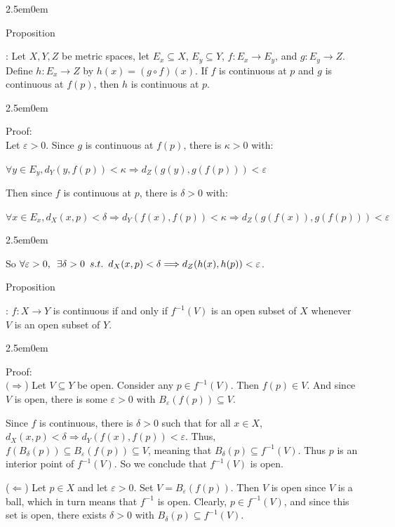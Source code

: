 \documentclass{book}
\newcommand{\hThree}{%
   \color{PineGreen}
   \fontsize{13}{15}\selectfont%
}
\newenvironment{myIndent}{%
   \begin{adjustwidth}{2.5em}{0em}%
}{%
   \end{adjustwidth}%
}
\newcommand{\retTwo}{\hfill\bigbreak}
\newcommand{\suchthat}{ \hspace{0.5em}s.t.\hspace{0.5em}}
\newcommand{\myHS}{ \hspace{0.5em}}
\newcounter{PropNumber}
\newcommand{\propCount}[1][1]{%
   \addtocounter{PropNumber}{#1}%
   \thePropNumber%
}
\begin{document}
{\begin{myIndent}
      Proposition \propCount: Let $X, Y, Z$ be metric spaces, let $E_x \subseteq X$, $E_y \subseteq Y$, $f: E_x \rightarrow E_y$, and $g: E_y \rightarrow Z$. Define $h: E_x \rightarrow Z$ by $h(x) = (g\circ f)(x)$. If $f$ is continuous at $p$ and $g$ is continuous at $f(p)$, then $h$ is continuous at $p$.

      {\begin{myIndent} \hThree
         Proof:\\
         Let $\varepsilon > 0$. Since $g$ is continuous at $f(p)$, there is $\kappa > 0$ with:

         {\centering $\forall y \in E_y, d_Y(y, f(p)) < \kappa \Rightarrow d_Z(g(y), g(f(p))) < \varepsilon$ \retTwo\par}

         Then since $f$ is continuous at $p$, there is $\delta > 0$ with:
      \end{myIndent}}{\hThree
         {\centering $\forall x \in E_x, d_X(x, p) < \delta \Rightarrow d_Y(f(x), f(p)) < \kappa \Rightarrow d_Z(g(f(x)), g(f(p))) < \varepsilon $ \retTwo\par}
      }{\begin{myIndent} \hThree

         So $\forall \varepsilon > 0, \myHS \exists \delta > 0 \suchthat d_X(x, p) < \delta \Longrightarrow d_Z(h(x), h(p)) < \varepsilon$. \retTwo\retTwo
      \end{myIndent}}

      Proposition \propCount: $f: X\rightarrow Y$ is continuous if and only if $f^{-1}(V)$ is an open subset of $X$ whenever $V$ is an open subset of $Y$.
      {\begin{myIndent} \hThree
         Proof:\\
         $(\Longrightarrow$) Let $V \subseteq Y$ be open. Consider any $p \in f^{-1}(V)$. Then $f(p) \in V$. And since $V$ is open, there is some $\varepsilon > 0$ with $B_\varepsilon(f(p)) \subseteq V$. \retTwo

         Since $f$ is continuous, there is $\delta > 0$ such that for all $x \in X$,\\ $d_X(x, p) < \delta \Longrightarrow d_Y(f(x), f(p)) < \varepsilon$. Thus, $f(B_\delta(p)) \subseteq B_\varepsilon(f(p)) \subseteq V$, meaning that $B_\delta(p) \subseteq f^{-1}(V)$. Thus $p$ is an interior point of $f^{-1}(V)$. So we conclude that $f^{-1}(V)$ is open. \retTwo

         ($\Longleftarrow$) Let $p \in X$ and let $\varepsilon > 0$. Set $V = B_\varepsilon(f(p))$. Then $V$ is open since $V$ is a ball, which in turn means that $f^{-1}$ is open. Clearly, $p \in f^{-1}(V)$, and since this set is open, there exists $\delta > 0$ with $B_\delta(p) \subseteq f^{-1}(V)$.


\end{myIndent}}
\end{myIndent}}
\end{document}

